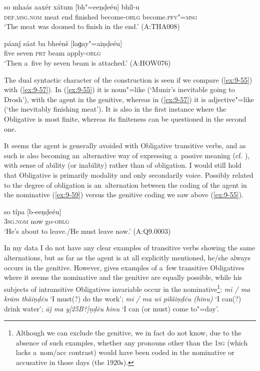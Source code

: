 \begin{exe}
\ex
\label{ex:9-57}
\gll so mhaás aaxér xátum [bh"=eeṇḍeéu] bhíl-u \\
\textsc{def.msg.nom} meat end finished become-\textsc{oblg} become.\textsc{pfv"=msg}  \\
\glt `The meat was doomed to finish in the end.' (A:THA008)

\ex
\label{ex:9-58}
\gll páanǰ sáat ba bheénš [laɡay"=aiṇḍeéu] \\
five seven \textsc{prt} beam apply-\textsc{oblg} \\
\glt `Then a~five by seven beam is attached.' (A:HOW076)
\end{exe}

The dual syntactic character of the construction is seen if we compare (\ref{ex:9-55}) with (\ref{ex:9-57}). In (\ref{ex:9-55}) it is noun"=like (`Munir's inevitable going to Drosh'), with the agent in the genitive, whereas in (\ref{ex:9-57}) it is adjective"=like (`the inevitably finishing meat'). It is also in the first instance where the Obligative is most finite, whereas its finiteness can be questioned in the second one.


It seems the agent is generally avoided with Obligative transitive verbs, and as such is also becoming an~alternative way of expressing a~passive meaning (cf. ), with sense of ability (or inability) rather than of obligation. I would still hold that Obligative is primarily modality and only secondarily voice. Possibly related to the degree of obligation is an~alternation between the coding of the agent in the nominative (\ref{ex:9-59}) versus the genitive coding we saw above (\ref{ex:9-55}).

\begin{exe}
\ex
\label{ex:9-59}
\gll so típa [b-eeṇḍeéu] \\
\textsc{3sg.nom} now go-\textsc{oblg} \\
\glt `He's about to leave./He must leave now.' (A:Q9.0003)
\end{exe}

In my data I do not have any clear examples of transitive verbs showing the same alternations, but as far as the agent is at all explicitly mentioned, he/she always occurs in the genitive. However, \citet[24]{morgenstierne1941} gives examples of a~few transitive Obligatives where it seems the nominative and the genitive are equally possible, while his subjects of intransitive Obligatives invariable occur in the nominative\footnote{Although we can exclude the genitive, we in fact do not know, due to the absence of such examples, whether any pronouns other than the \textsc{1sg} (which lacks a~nom/acc contrast) would have been coded in the nominative or accusative in those days (the 1920s).}: \textit{mī / ma krām thäiṇḍēu} `I must(?) do the work'; \textit{mī / ma wī piläiṇḍēu (hinu)} `I can(?) drink water'; \textit{āǰ ma y[25B?]ṇḍēu hinu} `I can (or must) come to"=day'.


